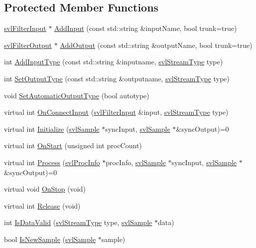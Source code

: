 \subsection*{Protected Member Functions}
\begin{DoxyCompactItemize}
\item 
\hyperlink{classsvl_filter_input}{svl\+Filter\+Input} $\ast$ \hyperlink{classsvl_filter_base_adce77c7bb49b299969eb0e00424a21de}{Add\+Input} (const std\+::string \&input\+Name, bool trunk=true)
\item 
\hyperlink{classsvl_filter_output}{svl\+Filter\+Output} $\ast$ \hyperlink{classsvl_filter_base_ac18bdc542bce9ef47ee7f612fb258041}{Add\+Output} (const std\+::string \&output\+Name, bool trunk=true)
\item 
int \hyperlink{classsvl_filter_base_abf749c32928ce1a0508b92aa2f15db32}{Add\+Input\+Type} (const std\+::string \&inputname, \hyperlink{svl_definitions_8h_aa00696d338a58db361335a01fd11e122}{svl\+Stream\+Type} type)
\item 
int \hyperlink{classsvl_filter_base_a5c51974427db1f5b8ec126c8c80fa1d7}{Set\+Output\+Type} (const std\+::string \&outputname, \hyperlink{svl_definitions_8h_aa00696d338a58db361335a01fd11e122}{svl\+Stream\+Type} type)
\item 
void \hyperlink{classsvl_filter_base_a3f8963a400373d4cd0957d3fc796ac10}{Set\+Automatic\+Output\+Type} (bool autotype)
\item 
virtual int \hyperlink{classsvl_filter_base_a7716e657fb8b592cbf31ad78cdb4c0e7}{On\+Connect\+Input} (\hyperlink{classsvl_filter_input}{svl\+Filter\+Input} \&input, \hyperlink{svl_definitions_8h_aa00696d338a58db361335a01fd11e122}{svl\+Stream\+Type} type)
\item 
virtual int \hyperlink{classsvl_filter_base_ac8eddcd9336c2b381facc8fb372e3bfb}{Initialize} (\hyperlink{classsvl_sample}{svl\+Sample} $\ast$sync\+Input, \hyperlink{classsvl_sample}{svl\+Sample} $\ast$\&sync\+Output)=0
\item 
virtual int \hyperlink{classsvl_filter_base_ad94fe80295839717e45117031e5cf60d}{On\+Start} (unsigned int proc\+Count)
\item 
virtual int \hyperlink{classsvl_filter_base_aaff77d711088384d00e717fb4ec88aab}{Process} (\hyperlink{structsvl_proc_info}{svl\+Proc\+Info} $\ast$proc\+Info, \hyperlink{classsvl_sample}{svl\+Sample} $\ast$sync\+Input, \hyperlink{classsvl_sample}{svl\+Sample} $\ast$\&sync\+Output)=0
\item 
virtual void \hyperlink{classsvl_filter_base_adf99599f927bf2934c9b4059e9dc2ed1}{On\+Stop} (void)
\item 
virtual int \hyperlink{classsvl_filter_base_ab689b852e2cee497fcd0ca6708105e17}{Release} (void)
\item 
int \hyperlink{classsvl_filter_base_ab26bdd0871500e75ceb34fe82da700ed}{Is\+Data\+Valid} (\hyperlink{svl_definitions_8h_aa00696d338a58db361335a01fd11e122}{svl\+Stream\+Type} type, \hyperlink{classsvl_sample}{svl\+Sample} $\ast$data)
\item 
bool \hyperlink{classsvl_filter_base_ab01958fc3c5ea21c49599e1dc40ac2ee}{Is\+New\+Sample} (\hyperlink{classsvl_sample}{svl\+Sample} $\ast$sample)
\end{DoxyCompactItemize}
